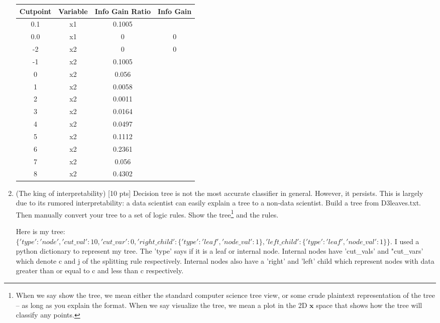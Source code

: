 \documentclass[a4paper]{article}
\theoremstyle{definition}
\def\x{\mathbf x}
\newenvironment{soln}{
    \leavevmode\color{blue}\ignorespaces
}{}
\begin{document}
\begin{enumerate}
\begin{soln}
  \begin{center}
  \begin{tabular}{|c|c|c|c|}
    \hline
    Cutpoint & Variable & Info Gain Ratio & Info Gain \\
    \hline
    0.1  &  x1  &  0.1005  & \\
    0.0  &  x1  &  0  &  0  \\
    -2  &  x2  &  0  &  0  \\
    -1  &  x2  &  0.1005  & \\
    0  &  x2  &  0.056  & \\
    1  &  x2  &  0.0058  & \\
    2  &  x2  &  0.0011  & \\
    3  &  x2  &  0.0164  & \\
    4  &  x2  &  0.0497  & \\
    5  &  x2  &  0.1112  & \\
    6  &  x2  &  0.2361  & \\
    7  &  x2  &  0.056  & \\
    8  &  x2  &  0.4302  & \\
    \hline
  \end{tabular}
  \end{center}
\end{soln}

\item (The king of interpretability)  [10 pts] Decision tree is not the most accurate classifier in general.  However, it persists.  This is largely due to its rumored interpretability: a data scientist can easily explain a tree to a non-data scientist.  Build a tree from D3leaves.txt.  Then manually convert your tree to a set of logic rules.  Show the tree\footnote{When we say show the tree, we mean either the standard computer science tree view, or some crude plaintext representation of the tree -- as long as you explain the format.  When we say visualize the tree, we mean a plot in the 2D $\x$ space that shows how the tree will classify any points.} and the rules. \\

\begin{soln}
  Here is my tree: $\{'type': 'node', 'cut\_val': 10, 'cut\_var': 0, 'right\_child': \{'type': 'leaf', 'node\_val': 1\}, 'left\_child': \{'type': 'leaf', 'node\_val': 1\}\}$.
  I used a python dictionary to represent my tree.
  The 'type' says if it is a leaf or internal node.
  Internal nodes have 'cut\_vals' and "cut\_vars' which denote c and j of the splitting rule respectively.
  Internal nodes also have a 'right' and 'left' child which represent nodes with data greater than or equal to c and less than c respectively.


\end{soln}
\end{enumerate}
\end{document}
